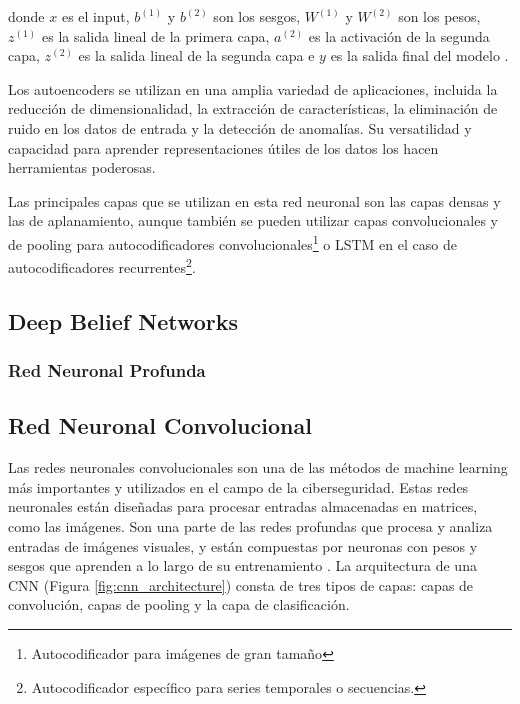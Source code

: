donde  $x$ es el input, \( b^{(1)} \) y  \( b^{(2)} \) son los sesgos,  \( W^{(1)} \) y  \( W^{(2)} \) son los pesos, \( z^{(1)} \) es la salida lineal de la primera capa, \( a^{(2)} \) es la activación de la segunda capa, \( z^{(2)} \) es la salida lineal de la segunda capa e \( y \) es la salida final del modelo \citep{martinez2017analisis}.


Los autoencoders se utilizan en una amplia variedad de aplicaciones, incluida la reducción de dimensionalidad, la extracción de características, la eliminación de ruido en los datos de entrada y la detección de anomalías. Su versatilidad y capacidad para aprender representaciones útiles de los datos los hacen herramientas poderosas.


Las principales capas que se utilizan en esta red neuronal son las capas densas y las de aplanamiento, aunque también se pueden utilizar capas convolucionales y de pooling para autocodificadores convolucionales\footnote{Autocodificador para imágenes de gran tamaño} o LSTM en el caso de autocodificadores recurrentes\footnote{Autocodificador específico para series temporales o secuencias.}\citep{geron2022hands}. 






\subsection{Deep Belief Networks}
\subsubsection{Red Neuronal Profunda}
\subsection{Red Neuronal Convolucional} \label{sec:2.CNN}


Las redes neuronales convolucionales son una de las métodos de machine learning más importantes y utilizados en el campo de la ciberseguridad. Estas redes neuronales están diseñadas para procesar entradas almacenadas en matrices, como las imágenes.  Son una parte de las redes profundas que procesa y analiza entradas de imágenes visuales, y están compuestas por neuronas con pesos y sesgos que aprenden a lo largo de su entrenamiento \citep{podder2021artificial}. La arquitectura de una CNN (Figura \ref{fig:cnn_architecture}) consta de tres tipos de capas: capas de convolución, capas de pooling y la capa de clasificación. 
 


